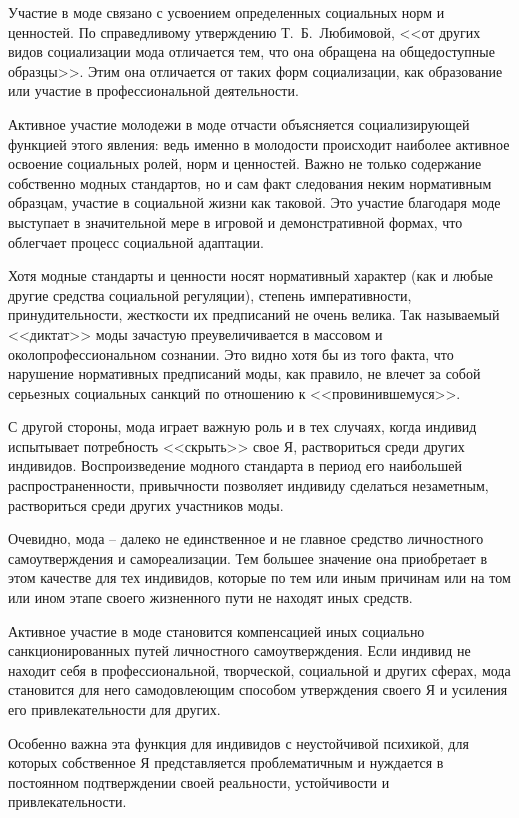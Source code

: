   Участие в моде связано с усвоением определенных социальных норм и ценностей.
  По справедливому утверждению Т.~Б.~Любимовой, <<от других видов социализации
  мода отличается тем, что она обращена на общедоступные образцы>>. Этим она
  отличается от таких форм социализации, как образование или участие в
  профессиональной деятельности.
  
  Активное участие молодежи в моде отчасти объясняется социализирующей функцией
  этого явления: ведь именно в молодости происходит наиболее активное освоение
  социальных ролей, норм и ценностей. Важно не только содержание собственно
  модных стандартов, но и сам факт следования неким нормативным образцам,
  участие в социальной жизни как таковой. Это участие благодаря моде выступает в
  значительной мере в игровой и демонстративной формах, что облегчает процесс
  социальной адаптации.
  
  Хотя модные стандарты и ценности носят нормативный характер (как и любые
  другие средства социальной регуляции), степень императивности,
  принудительности, жесткости их предписаний не очень велика. Так называемый
  <<диктат>> моды зачастую преувеличивается в массовом и околопрофессиональном
  сознании. Это видно хотя бы из того факта, что нарушение нормативных
  предписаний моды, как правило, не влечет за собой серьезных социальных санкций
  по отношению к <<провинившемуся>>.
  
  С другой стороны, мода играет важную роль и в тех случаях, когда индивид
  испытывает потребность <<скрыть>> свое Я, раствориться среди других индивидов.
  Воспроизведение модного стандарта в период его наибольшей распространенности,
  привычности позволяет индивиду сделаться незаметным, раствориться среди других
  участников моды.
  
  Очевидно, мода – далеко не единственное и не главное средство личностного
  самоутверждения и самореализации. Тем большее значение она приобретает в этом
  качестве для тех индивидов, которые по тем или иным причинам или на том или
  ином этапе своего жизненного пути не находят иных средств.
  
  Активное участие в моде становится компенсацией иных социально
  санкционированных путей личностного самоутверждения. Если индивид не находит
  себя в профессиональной, творческой, социальной и других сферах, мода
  становится для него самодовлеющим способом утверждения своего Я и усиления его
  привлекательности для других.
  
  Особенно важна эта функция для индивидов с неустойчивой психикой, для которых
  собственное Я представляется проблематичным и нуждается в постоянном
  подтверждении своей реальности, устойчивости и привлекательности.
  
